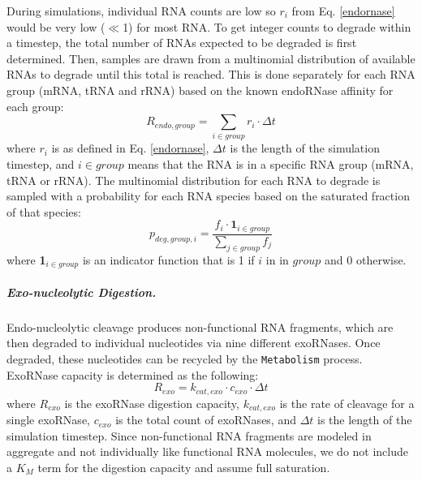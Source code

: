 \documentclass[12pt]{article}
\begin{document}
During simulations, individual RNA counts are low so $r_i$ from Eq. \ref{endornase} would be very low ($\ll$1) for most RNA. To get integer counts to degrade within a timestep, the total number of RNAs expected to be degraded is first determined. Then, samples are drawn from a multinomial distribution of available RNAs to degrade until this total is reached.  This is done separately for each RNA group (mRNA, tRNA and rRNA) based on the known endoRNase affinity for each group:
\begin{equation}
    R_{endo,group} = \sum\limits_{i \in group} r_i \cdot \Delta t
\end{equation}
\noindent where $r_i$ is as defined in Eq. \ref{endornase}, $\Delta t$ is the length of the simulation timestep, and $i \in group$ means that the RNA is in a specific RNA group (mRNA, tRNA or rRNA). The multinomial distribution for each RNA to degrade is sampled with a probability for each RNA species based on the saturated fraction of that species:
\begin{equation}
    p_{deg, group, i} = \frac{f_i \cdot \textbf{1}_{i\in group}}{\sum\limits_{j \in group} f_j}
\end{equation}
\noindent where \textbf{1}$_{i\in group}$ is an indicator function that is 1 if $i$ in in $group$ and 0 otherwise.

\subparagraph{Exo-nucleolytic Digestion.}
Endo-nucleolytic cleavage produces non-functional RNA fragments, which are then degraded to individual nucleotides via nine different exoRNases. Once degraded, these nucleotides can be recycled by the \texttt{Metabolism} process.  ExoRNase capacity is determined as the following:
\begin{equation}
    R_{exo} = k_{cat,exo} \cdot c_{exo} \cdot \Delta t
\end{equation}
\noindent where $R_{exo}$ is the exoRNase digestion capacity, $k_{cat,exo}$ is the rate of cleavage for a single exoRNase, $c_{exo}$ is the total count of exoRNases, and $\Delta t$ is the length of the simulation timestep. Since non-functional RNA fragments are modeled in aggregate and not individually like functional RNA molecules, we do not include a $K_M$ term for the digestion capacity and assume full saturation.
\end{document}
